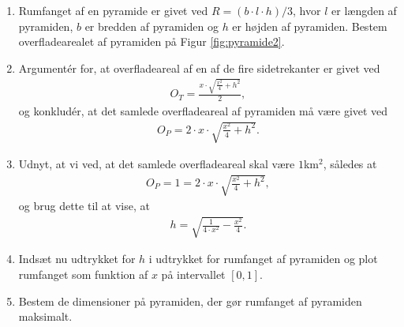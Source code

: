 \begin{enumerate}[label=\roman*)]
\item Rumfanget af en pyramide er givet ved $R = (b\cdot l\cdot h)/3$, hvor $l$ er længden af pyramiden, $b$ er bredden af pyramiden og $h$ er højden af pyramiden. Bestem overfladearealet af pyramiden på Figur \ref{fig:pyramide2}.
\item Argumentér for, at overfladeareal af en af de fire sidetrekanter er givet ved 
\begin{align*}
O_T = \frac{x\cdot\sqrt{\frac{x^2}{4}+h^2}}{2},
\end{align*}
og konkludér, at det samlede overfladeareal af pyramiden må være givet ved 
\begin{align*}
O_P = 2\cdot x\cdot \sqrt{\frac{x^2}{4}+h^2}.
\end{align*}

\item Udnyt, at vi ved, at det samlede overfladeareal skal være $1$km$^2$, således at 
\begin{align*}
O_P = 1 = 2\cdot x\cdot \sqrt{\frac{x^2}{4}+h^2},
\end{align*}
og brug dette til at vise, at 
\begin{align*}
h=\sqrt{\frac{1}{4\cdot x^2}-\frac{x^2}{4}}.
\end{align*}

\item Indsæt nu udtrykket for $h$ i udtrykket for rumfanget af pyramiden og plot rumfanget som funktion af $x$ på intervallet $[0,1]$. 
\item Bestem de dimensioner på pyramiden, der gør rumfanget af pyramiden maksimalt.
\end{enumerate}

